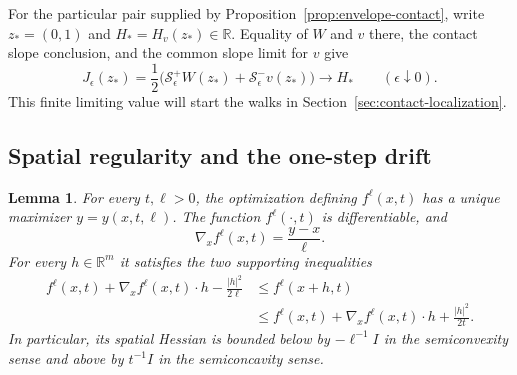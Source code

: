 \documentclass[11pt]{article}
\numberwithin{equation}{section}
\newtheorem{lemma}[theorem]{Lemma}
\theoremstyle{definition}
\theoremstyle{remark}
\newcommand{\R}{\mathbb{R}}
\newcommand{\Senv}{\mathcal{S}}
\begin{document}
For the particular pair supplied by Proposition~\ref{prop:envelope-contact},
write $z_*=(0,1)$ and $H_*=H_v(z_*)\in\R$.  Equality of $W$ and $v$ there,
the contact slope conclusion, and the common slope limit for $v$ give
\begin{equation}\label{eq:dp-J-contact}
  J_\epsilon(z_*)
  =\frac12\bigl(\Senv^+_\epsilon W(z_*)+
                    \Senv^-_\epsilon v(z_*)\bigr)
  \longrightarrow H_*\qquad(\epsilon\downarrow0).
\end{equation}
This finite limiting value will start the walks in
Section~\ref{sec:contact-localization}.

\subsection{Spatial regularity and the one-step drift}

\begin{lemma}\label{lem:dp-spatial-regularity}
For every $t,\ell>0$, the optimization defining $f^\ell(x,t)$ has a unique
maximizer $y=y(x,t,\ell)$.  The function $f^\ell(\cdot,t)$ is differentiable,
and
\begin{equation}\label{eq:dp-gradient}
  \nabla_x f^\ell(x,t)=\frac{y-x}{\ell}.
\end{equation}
For every $h\in\R^m$ it satisfies the two supporting inequalities
\begin{equation}\label{eq:dp-supports}
\begin{split}
  f^\ell(x,t)+\nabla_x f^\ell(x,t)\cdot h-\frac{|h|^2}{2\ell}
  &\le f^\ell(x+h,t)\\
  &\le f^\ell(x,t)+\nabla_x f^\ell(x,t)\cdot h+\frac{|h|^2}{2t}.
\end{split}
\end{equation}
In particular, its spatial Hessian is bounded below by $-\ell^{-1}I$ in the
semiconvexity sense and above by $t^{-1}I$ in the semiconcavity sense.
\end{lemma}
\end{document}
